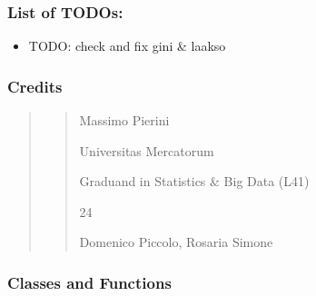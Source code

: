 \documentclass[letterpaper,10pt,english]{sphinxmanual}
\begin{document}
\subsubsection{List of TODOs:}
\label{\detokenize{cubmods:id459}}\begin{itemize}
\item {} 
\sphinxAtStartPar
TODO: check and fix gini \& laakso

\end{itemize}


\subsubsection{Credits}
\label{\detokenize{cubmods:id460}}\begin{quote}
\begin{quote}\begin{description}
\sphinxAtStartPar
Massimo Pierini

\sphinxAtStartPar
Universitas Mercatorum

\sphinxAtStartPar
Graduand in Statistics \& Big Data (L41)

\sphinxhyphen{}24

\sphinxAtStartPar
Domenico Piccolo, Rosaria Simone

\sphinxAtStartPar
{}

\end{description}\end{quote}
\end{quote}


\subsubsection{Classes and Functions}
\label{\detokenize{cubmods:id461}}
\end{document}
